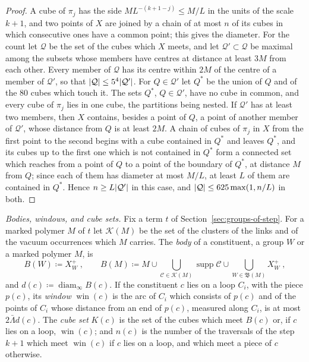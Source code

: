 \documentclass[11pt]{preprint}
\newcommand{\diam}{\operatorname{diam}}
\DeclarePairedDelimiter{\abs}{\lvert}{\rvert}
\numberwithin{equation}{section}
\theoremstyle{definition}
\theoremstyle{remark}
\theoremstyle{plain}
\begin{document}
\begin{proof}
A cube of $\pi_j$ has the side $ML^{-(k+1-j)} \leq M/L$ in the units of the scale $k + 1$, and two points of $X$ are joined by a chain of at most $n$ of its cubes in which consecutive ones have a common point; this gives the diameter. For the count let $\mathcal Q$ be the set of the cubes which $X$ meets, and let $\mathcal Q' \subset \mathcal Q$ be maximal among the subsets whose members have centres at distance at least $3M$ from each other. Every member of $\mathcal Q$ has its centre within $2M$ of the centre of a member of $\mathcal Q'$, so that $\abs{\mathcal Q} \leq 5^4\abs{\mathcal Q'}$. For $Q \in \mathcal Q'$ let $Q^*$ be the union of $Q$ and of the $80$ cubes which touch it. The sets $Q^*$, $Q \in \mathcal Q'$, have no cube in common, and every cube of $\pi_j$ lies in one cube, the partitions being nested. If $\mathcal Q'$ has at least two members, then $X$ contains, besides a point of $Q$, a point of another member of $\mathcal Q'$, whose distance from $Q$ is at least $2M$. A chain of cubes of $\pi_j$ in $X$ from the first point to the second begins with a cube contained in $Q^*$ and leaves $Q^*$, and its cubes up to the first one which is not contained in $Q^*$ form a connected set which reaches from a point of $Q$ to a point of the boundary of $Q^*$, at distance $M$ from $Q$; since each of them has diameter at most $M/L$, at least $L$ of them are contained in $Q^*$. Hence $n \geq L\abs{\mathcal Q'}$ in this case, and $\abs{\mathcal Q} \leq 625\max(1, n/L)$ in both.
\end{proof}

\emph{Bodies, windows, and cube sets.} Fix a term $t$ of Section~\ref{sec:groups-of-step}. For a marked polymer $M$ of $t$ let $\mathcal K(M)$ be the set of the clusters of the links and of the vacuum occurrences which $M$ carries. The \emph{body} of a constituent, a group $W$ or a marked polymer $M$, is
\begin{equation}\label{eq:bodies}
    B(W) \coloneqq X^+_W\;,
    \qquad
    B(M) \coloneqq M \cup \bigcup_{\mathcal C \in \mathcal K(M)}\operatorname{supp}\mathcal C \cup \bigcup_{W \in \mathfrak B(M)}X^+_W\;,
\end{equation}
and $d(c) \coloneqq \diam_\infty B(c)$. If the constituent $c$ lies on a loop $C_i$, with the piece $p(c)$, its \emph{window} $\operatorname{win}(c)$ is the arc of $C_i$ which consists of $p(c)$ and of the points of $C_i$ whose distance from an end of $p(c)$, measured along $C_i$, is at most $2\bar\Lambda d(c)$. The \emph{cube set} $K(c)$ is the set of the cubes which meet $B(c)$ or, if $c$ lies on a loop, $\operatorname{win}(c)$; and $n(c)$ is the number of the traversals of the step $k + 1$ which meet $\operatorname{win}(c)$ if $c$ lies on a loop, and which meet a piece of $c$ otherwise.
\end{document}
